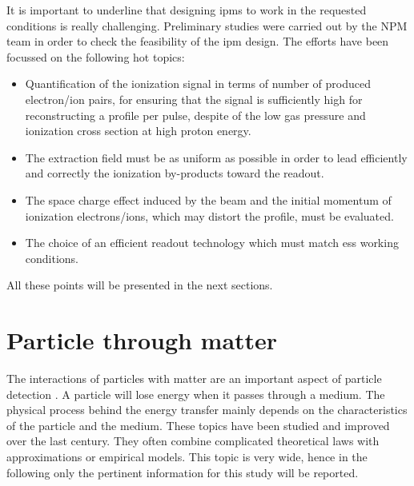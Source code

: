 \begin{refsection}
  It is important to underline that designing \acrshort{ipm}s to work in the requested conditions is really challenging. Preliminary studies were carried out by the NPM team in order to check the feasibility of the \acrshort{ipm} design. The efforts have been focussed on the following hot topics:
  \begin{itemize}
    \item Quantification of the ionization signal in terms of number of produced electron/ion pairs, for ensuring that the signal is sufficiently high for reconstructing a profile per pulse, despite of the low gas pressure and ionization cross section at high proton energy.
    \item The extraction field must be as uniform as possible in order to lead efficiently and correctly the ionization by-products toward the readout. %
    \item The space charge effect induced by the beam and the initial momentum of ionization electrons/ions, which may distort the profile, must be evaluated.
    \item The choice of an efficient readout technology which must match \acrshort{ess} working conditions.
  \end{itemize}
  All these points will be presented in the next sections.


  \section{Particle through matter}
  \label{chap3:sec_particle_in_matter}
  The interactions of particles with matter are an important aspect of particle detection \cite{Knoll2010,Leo1994}. A particle will lose energy when it passes through a medium. The physical process behind the energy transfer mainly depends on the characteristics of the particle and the medium. These topics have been studied and improved over the last century. They often combine complicated theoretical laws with approximations or empirical models. This topic is very wide, hence in the following only the pertinent information for this study will be reported.


\end{refsection}
